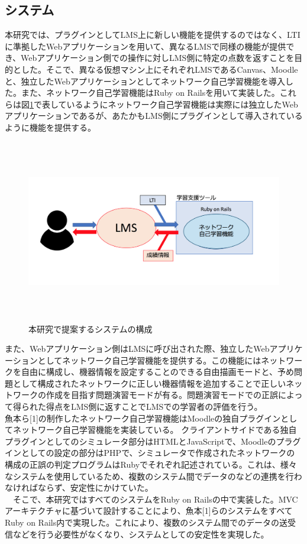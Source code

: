 \subsection{システム}
\label{tag:function}
本研究では、プラグインとしてLMS上に新しい機能を提供するのではなく、LTIに準拠したWebアプリケーションを用いて、異なるLMSで同様の機能が提供でき、Webアプリケーション側での操作に対しLMS側に特定の点数を返すことを目的とした。そこで、異なる仮想マシン上にそれぞれLMSであるCanvas、Moodleと、独立したWebアプリケーションとしてネットワーク自己学習機能を導入した。また、ネットワーク自己学習機能はRuby on Railsを用いて実装した。これらは図\ref{fig:virtualMachine}で表しているようにネットワーク自己学習機能は実際には独立したWebアプリケーションであるが、あたかもLMS側にプラグインとして導入されているように機能を提供する。

\begin{figure}[htbp]
  \begin{center}
    \includegraphics[clip,width=12.0cm,height=8.0cm]{img/system2.png}
    \caption{本研究で提案するシステムの構成}
    \label{fig:virtualMachine}
  \end{center}
\end{figure}



また、Webアプリケーション側はLMSに呼び出された際、独立したWebアプリケーションとしてネットワーク自己学習機能を提供する。この機能にはネットワークを自由に構成し、機器情報を設定することのできる自由描画モードと、予め問題として構成されたネットワークに正しい機器情報を追加することで正しいネットワークの作成を目指す問題演習モードが有る。問題演習モードでの正誤によって得られた得点をLMS側に返すことでLMSでの学習者の評価を行う。\\
魚本ら[1]の制作したネットワーク自己学習機能はMoodleの独自プラグインとしてネットワーク自己学習機能を実装している。
クライアントサイドである独自プラグインとしてのシミュレータ部分はHTMLとJavaScriptで、Moodleのプラグインとしての設定の部分はPHPで、シミュレータで作成されたネットワークの構成の正誤の判定プログラムはRubyでそれぞれ記述されている。これは、様々なシステムを使用しているため、複数のシステム間でデータのなどの連携を行わなければならず、安定性にかけていた。\\
　そこで、本研究ではすべてのシステムをRuby on Railsの中で実装した。MVCアーキテクチャに基づいて設計することにより、魚本[1]らのシステムをすべてRuby on Rails内で実現した。これにより、複数のシステム間でのデータの送受信などを行う必要性がなくなり、システムとしての安定性を実現した。
